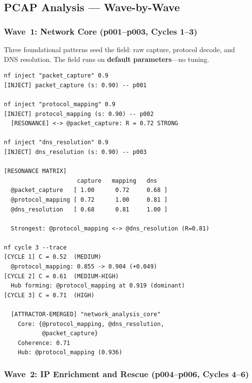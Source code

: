 
\subsection{PCAP Analysis --- Wave-by-Wave}\label{app:pcap-waves}

\subsubsection*{Wave~1: Network Core (p001--p003, Cycles 1--3)}

Three foundational patterns seed the field: raw capture, protocol
decode, and DNS resolution.  The field runs on \textbf{default
parameters}---no tuning.

\begin{terminalbox}
\begin{lstlisting}[style=neosshell]
nf inject "packet_capture" 0.9
[INJECT] packet_capture (s: 0.90) -- p001

nf inject "protocol_mapping" 0.9
[INJECT] protocol_mapping (s: 0.90) -- p002
  [RESONANCE] <-> @packet_capture: R = 0.72 STRONG

nf inject "dns_resolution" 0.9
[INJECT] dns_resolution (s: 0.90) -- p003

[RESONANCE MATRIX]
                     capture   mapping   dns
  @packet_capture   [ 1.00      0.72     0.68 ]
  @protocol_mapping [ 0.72      1.00     0.81 ]
  @dns_resolution   [ 0.68      0.81     1.00 ]

  Strongest: @protocol_mapping <-> @dns_resolution (R=0.81)

nf cycle 3 --trace
[CYCLE 1] C = 0.52  (MEDIUM)
  @protocol_mapping: 0.855 -> 0.904 (+0.049)
[CYCLE 2] C = 0.61  (MEDIUM-HIGH)
  Hub forming: @protocol_mapping at 0.919 (dominant)
[CYCLE 3] C = 0.71  (HIGH)

  [ATTRACTOR-EMERGED] "network_analysis_core"
    Core: {@protocol_mapping, @dns_resolution,
           @packet_capture}
    Coherence: 0.71
    Hub: @protocol_mapping (0.936)
\end{lstlisting}
\end{terminalbox}

\subsubsection*{Wave~2: IP Enrichment and Rescue (p004--p006, Cycles 4--6)}

